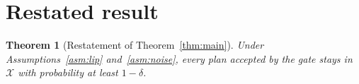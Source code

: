 \documentclass[letterpaper,10pt]{article}
\newtheorem{theorem}{Theorem}
\begin{document}




\appendix
\section{Restated result}\label{sec:appendix}
\begin{theorem}[Restatement of Theorem~\ref{thm:main}]
Under Assumptions~\ref{asm:lip} and~\ref{asm:noise}, every plan accepted by the gate stays in
$\mathcal{X}$ with probability at least $1-\delta$.
\end{theorem}
\end{document}
